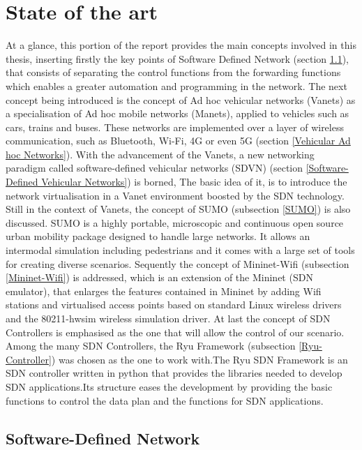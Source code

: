 \documentclass[
  oneside,
  11pt, a4paper,
  footinclude=true,
  headinclude=true,
  cleardoublepage=empty
]{scrbook}
\begin{document}
\chapter{State of the art}
\label{State of-the art}
At a glance, this portion of the report   provides the main concepts involved in this thesis, inserting firstly the key points of Software Defined Network (section \ref{Software-Defined Network}), that consists of separating the control functions from the forwarding functions which enables a greater automation and programming in the network. The next concept being introduced is the  concept of Ad hoc vehicular networks (Vanets) as a specialisation of Ad hoc mobile networks (Manets), applied to vehicles such as cars, trains and buses. These networks are implemented over a layer of wireless communication, such as Bluetooth, Wi-Fi, 4G or even 5G (section \ref{Vehicular Ad hoc Networks}).  With the advancement of the Vanets, a new networking paradigm  called software-defined vehicular networks (SDVN) (section \ref{Software-Defined Vehicular Networks}) is borned, The basic idea of it, is to introduce the network virtualisation in a Vanet environment boosted by the SDN technology. Still in the context of Vanets, the concept of SUMO (subsection \ref{SUMO}) is also discussed. SUMO is a highly portable, microscopic and continuous open source urban mobility package designed to handle large networks. It allows an intermodal simulation including pedestrians and it comes with a large set of tools for creating diverse scenarios. Sequently the concept of Mininet-Wifi (subsection \ref{Mininet-Wifi}) is addressed, which is an extension of the Mininet (SDN emulator), that enlarges the features contained in Mininet by adding Wifi stations and virtualised access points based on standard Linux wireless drivers and the 80211-hwsim wireless simulation driver. 
 At last the concept of SDN Controllers is emphasised as the one that will allow the control of our scenario. Among the many SDN Controllers, the Ryu Framework (subsection \ref{Ryu-Controller}) was chosen as the one to work with.The Ryu SDN Framework is an SDN controller written in python that provides the libraries needed to develop SDN applications.Its structure eases the development by providing the basic functions to control the data plan and the functions for SDN applications.

\section{Software-Defined Network}
\label{Software-Defined Network}
\end{document}
